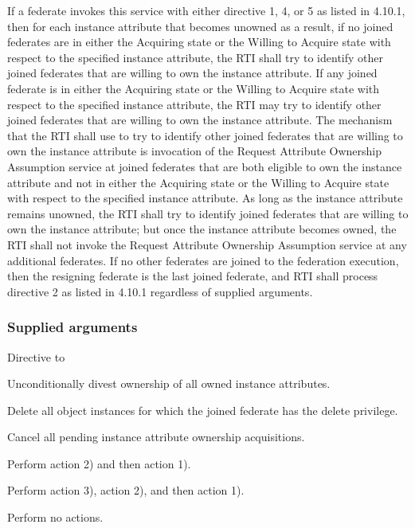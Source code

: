 If a federate invokes this service with either directive 1, 4, or 5 as listed in 4.10.1, then for each instance attribute that becomes unowned as a result, if no joined federates are in either the Acquiring state or the Willing to Acquire state with respect to the specified instance attribute, the RTI shall try to identify other joined federates that are willing to own the instance attribute. If any joined federate is in either the Acquiring state or the Willing to Acquire state with respect to the specified instance attribute, the RTI may try to identify other joined federates that are willing to own the instance attribute. The mechanism that the RTI shall use to try to identify other joined federates that are willing to own the instance attribute is invocation of the Request Attribute Ownership Assumption \rtiinitiated{} service at joined federates that are both eligible to own the instance attribute and not in either the Acquiring state or the Willing to Acquire state with respect to the specified instance attribute. As long as the instance attribute remains unowned, the RTI shall try to identify joined federates that are willing to own the instance attribute; but once the instance attribute becomes owned, the RTI shall not invoke the Request Attribute Ownership Assumption \rtiinitiated{} service at any additional federates. If no other federates are joined to the federation execution, then the resigning federate is the last joined federate, and RTI shall process directive 2 as listed in 4.10.1 regardless of supplied arguments.

\clearpage


\subsubsection{Supplied arguments}

\begin{stdalphalist}
    \item Directive to
    \begin{stdnumlist}
        \item Unconditionally divest ownership of all owned instance attributes.
        \item Delete all object instances for which the joined federate has the delete privilege.
        \item Cancel all pending instance attribute ownership acquisitions.
        \item Perform action 2) and then action 1).
        \item Perform action 3), action 2), and then action 1).
        \item Perform no actions.
    \end{stdnumlist}
\end{stdalphalist}

